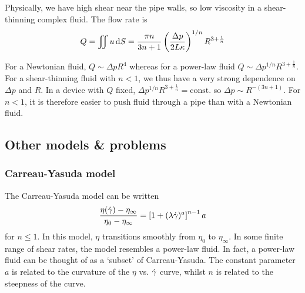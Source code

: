 \documentclass{jknotes}
\begin{document}
Physically, we have high shear near the pipe walls, so low viscosity in a
shear-thinning complex fluid. The flow rate is
\begin{equation}
	Q = \iint u \, \diffd S = \frac{\pi n}{3n+1} \left(\frac{\Delta p}{2 L
	\kappa}\right)^{1/n} R^{3+\frac{1}{n}}
\end{equation}

For a Newtonian fluid, $Q \sim \Delta p R^4$ whereas for a power-law fluid $Q
\sim \Delta p ^{1/n} R^{3+\frac{1}{n}}$. For a shear-thinning fluid with $n <
1$, we thus have a very strong dependence on $\Delta p$ and $R$. In a device
with $Q$ fixed, $\Delta p^{1/n} R^{3+\frac{1}{n}} = \text{const.}$ so $\Delta
p \sim R^{-(3n+1)}$. For $n < 1$, it is therefore easier to push fluid through
a pipe than with a Newtonian fluid.

\subsection{Other models \& problems}
\subsubsection{Carreau-Yasuda model}
The Carreau-Yasuda model can be written
\begin{equation}
	\frac{\eta(\dot{\gamma})-\eta_\infty}{\eta_0 - \eta_\infty} = \left[ 1 +
	(\lambda \dot{\gamma})^a\right]^{n-1}{a}
\end{equation}
for $n \le 1$. In this model, $\eta$ transitions smoothly from $\eta_0$ to
$\eta_\infty$. In some finite range of shear rates, the model resembles a
power-law fluid. In fact, a power-law fluid can be thought of as a `subset' of
Carreau-Yasuda. The constant parameter $a$ is related to the curvature of the
$\eta$ vs. $\dot{\gamma}$ curve, whilst $n$ is related to the steepness of the
curve.

\begin{center}
\end{center}
\end{document}
